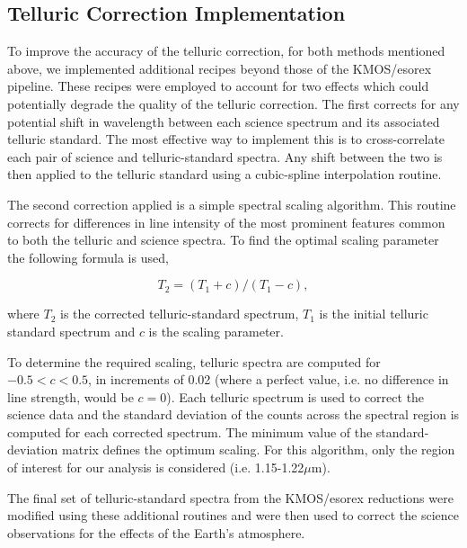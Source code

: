 
\subsection{Telluric Correction Implementation} %
\label{sub:ngc6822_telluric_correction}

To improve the accuracy of the telluric correction,
for both methods mentioned above,
we implemented additional recipes beyond those of the KMOS/esorex pipeline.
These recipes were employed to account for two effects which could potentially degrade the quality of the telluric correction.
The first corrects for any potential shift in wavelength between each science spectrum and its associated telluric standard.
The most effective way to implement this is to cross-correlate each pair of science and telluric-standard spectra.
Any shift between the two is then applied to the telluric standard using a cubic-spline interpolation routine.

The second correction applied is a simple spectral scaling algorithm.
This routine corrects for differences in line intensity of the most prominent features common to both the telluric and science spectra.
To find the optimal scaling parameter the following formula is used,

\begin{equation} \label{eq:shiftandres}
T_{2} = (T_{1} + c) / (T_{1} - c),
\end{equation}

\noindent where $T_{2}$ is the corrected telluric-standard spectrum,
$T_{1}$ is the initial telluric standard spectrum and $c$ is the scaling parameter.

To determine the required scaling,
telluric spectra are computed for $-0.5<c<0.5$, in increments of 0.02
(where a perfect value, i.e. no difference in line strength, would be $c=0$).
Each telluric spectrum is used to correct the science data and the standard deviation of the counts across the spectral region is computed for each corrected spectrum.
The minimum value of the standard-deviation matrix defines the optimum scaling.
For this algorithm, only the region of interest for our analysis is considered
(i.e. 1.15-1.22$\mu$m).

The final set of telluric-standard spectra from the KMOS/esorex reductions were modified using these additional routines and were then used to correct the science observations for the effects of the Earth's atmosphere.



